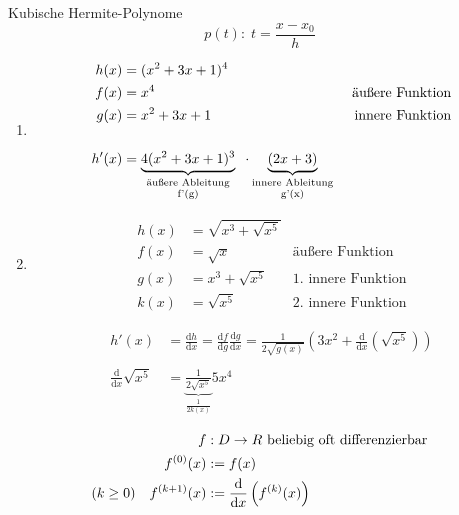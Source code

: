 \begin{example}
	Kubische Hermite-Polynome
	\begin{equation*}
		p(t):\; t = \frac{x-x_0}{h}
	\end{equation*}
	
	\begin{enumerate}
		\item
		\begin{align*}
			h(x) &= (x^2 + 3x + 1)^4\\
			f(x) &= x^4 &\text{äußere Funktion} \\
			g(x) &= x^2 + 3x + 1 &\text{innere Funktion} \\
			\\
			h'(x) &= \underbrace{4 (x^2 + 3x + 1)^3}_{\parbox{23mm}{\centering\scriptsize \text{äußere Ableitung} f'(g)}}\;\;\cdot\!\! \underbrace{(2x + 3)}_{\parbox{23mm}{\centering\scriptsize \text{innere Ableitung} g'(x)}}
		\end{align*}
		
		\item
		\begin{align*}
			h(x) &= \sqrt{x^3 + \sqrt{x^5}} \\
			f(x) &= \sqrt{x} & \text{äußere Funktion}\\
			g(x) &= x^3 + \sqrt{x^5} & \text{1. innere Funktion} \\
			k(x) &= \sqrt{x^5} & \text{2. innere Funktion}
		\end{align*}
		
		\begin{align*}
			h'(x) &= \frac{\mathrm dh}{\mathrm dx} = 
			\frac{\mathrm df}{\mathrm dg}\frac{\mathrm dg}{\mathrm dx} =
			\frac{1}{2\sqrt{g(x)}} \left( 3x^2 + \frac{\mathrm d}{\mathrm dx} \left( \sqrt{x^5} \right)\right) \\
			\\
			\frac{\mathrm d}{\mathrm dx} \sqrt{x^5} &= \underbrace{\frac{1}{2\sqrt{x^5}}}_{\frac{1}{2k(x)}} 5x^4
		\end{align*}
	\end{enumerate}
\end{example}

\begin{definition}
	\begin{align*}
		f&: D \rightarrow R \text{ beliebig oft differenzierbar} \\
		f^{(0)}(x) &:= f(x) \\
		(k \geq 0) \hspace{10px} f^{(k+1)}(x) &:= \frac{\mathrm d}{\mathrm dx} \left( f^{(k)}(x) \right)
	\end{align*}
\end{definition}
	
